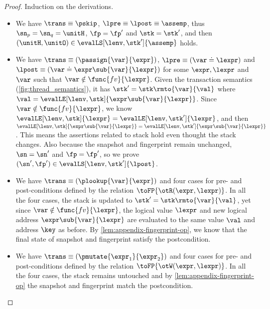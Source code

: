 \begin{proof}
Induction on the derivations.

\begin{itemize}

\item {}
We have \(\trans \equiv \pskip\), \( \lpre \equiv \lpost \equiv \assemp \), thus \( \sn_{p} = \sn_{q} = \unitH \), \( \fp = \fp' \) and \( \stk = \stk' \), and then \( (\unitH,\unitO ) \in \evalLS[\lenv, \stk']{\assemp} \) holds.

\item {}
We have \(\trans \equiv ( \passign{\var}{\expr} ) \), \( \lpre \equiv ( \var \doteq \lexpr ) \) and \( \lpost \equiv ( \var \doteq \expr\sub{\var}{\lexpr} ) \) 
for some \( \expr, \lexpr \) and \( \var \) such that \( \var \notin \func{fv}{\lexpr}\).
Given the transaction semantics (\cref{fig:thread_semantics}), it has \( \stk' = \stk\rmto{\var}{\val} \) where \( \val = \evalLE[\lenv, \stk]{\expr\sub{\var}{\lexpr}} \).
Since \( \var \notin \func{fv}{\lexpr} \), we know \( \evalLE[\lenv, \stk]{\lexpr} = \evalLE[\lenv, \stk']{\lexpr} \), and then \( \evalLE[\lenv, \stk]{\expr\sub{\var}{\lexpr}} = \evalLE[\lenv, \stk']{\expr\sub{\var}{\lexpr}} \).
This means the assertions related to stack hold even thought the stack changes.
Also because the snapshot and fingerprint remain unchanged, \ie \( \sn = \sn' \) and \( \fp = \fp' \), so we prove \( (\sn', \fp' ) \in \evalLS[\lenv, \stk']{\lpost} \).

\item {}
We have \(\trans \equiv ( \plookup{\var}{\expr} ) \) and four cases for pre- and post-conditions defined by the relation \( \toFP{\otR(\expr, \lexpr)}\).
In all the four cases, the stack is updated to \( \stk' = \stk\rmto{\var}{\val} \), yet since \( \var \notin \func{fv}{\lexpr}\), the logical value \( \lexpr \) and new logical address \( \expr\sub{\var}{\lexpr}\) are evaluated to the same value \( \val \) and address \( \key \) as before.
By \cref{lem:appendix-fingerprint-op}, we know that the final state of snapshot and fingerprint satisfy the postcondition.

\item {}
We have  \( \trans \equiv (\pmutate{\expr_{1}}{\expr_{2}}) \) and four cases for pre- and post-conditions defined by the relation \( \toFP{\otW(\expr, \lexpr)}\). 
In all the four cases, the stack remains untouched and  by \cref{lem:appendix-fingerprint-op} the snapshot and fingerprint match the postcondition.


\end{itemize}
\end{proof}
